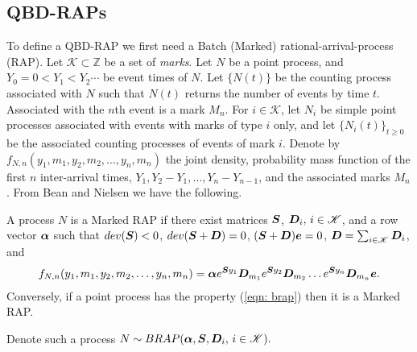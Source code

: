 \subsection{QBD-RAPs}\label{sec: qbd-rap}

To define a QBD-RAP we first need a Batch (Marked) rational-arrival-process (RAP). Let \(\mathscr K\subset \mathbb Z\) be a set of \emph{marks}. Let \(N\) be a point process, and \(Y_0=0<Y_1<Y_2\cdots\) be event times of \(N\). Let \(\{N(t)\}\) be the counting process associated with \(N\) such that \(N(t)\) returns the number of events by time \(t\). Associated with the \(n\)th event is a mark \(M_n\). For \(i\in\mathscr K\), let \(N_i\) be simple point processes associated with events with marks of type \(i\) only, and let \(\{N_i(t)\}_{t\geq 0}\) be the associated counting processes of events of mark \(i\). Denote by \(f_{N,n}(y_1,m_1,y_2,m_2,\dots,y_n,m_n)\) the joint density, probability mass function of the first \(n\) inter-arrival times, \(Y_1,Y_2-Y_1,\dots,Y_n-Y_{n-1}\), and the associated marks \(M_n\). From Bean and Nielsen \cite[Theorem 1]{bn2010} we have the following. 
\begin{thm}
A process \(N\) is a Marked RAP if there exist matrices \(\boldsymbol S\), \(\boldsymbol D_i,\,i\in\mathscr K\), and a row vector \(\boldsymbol \alpha\) such that \(dev(\boldsymbol S)<0\), \(dev(\boldsymbol S+\boldsymbol D)=0\), \((\boldsymbol S+\boldsymbol D)\boldsymbol e = 0\), \(\boldsymbol D = \sum_{i\in\mathscr K} \boldsymbol D_i\), and 
\begin{align}f_{N,n}(y_1,m_1,y_2,m_2,\dots,y_n,m_n) = \boldsymbol \alpha e^{\boldsymbol S y_1}\boldsymbol D_{m_1} e^{\boldsymbol S y_2} \boldsymbol D_{m_2}\dots e^{\boldsymbol S y_n} \boldsymbol D_{m_n}\boldsymbol e.\label{eqn: brap}\end{align}
Conversely, if a point process has the property (\ref{eqn: brap}) then it is a Marked RAP.
\end{thm}

Denote such a process \(N\sim BRAP(\boldsymbol \alpha, \boldsymbol S, \boldsymbol D_i,\,i\in\mathscr K).\)

